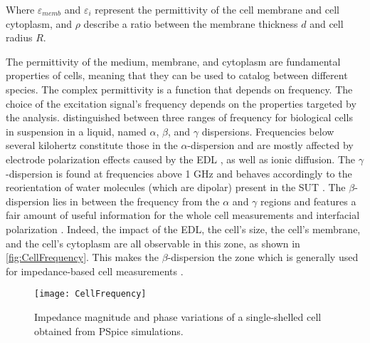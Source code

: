 Where $\varepsilon_{memb}$ and $\varepsilon_{i}$ represent the permittivity of the cell membrane and cell cytoplasm, and $\rho$ describe a ratio between the membrane thickness $d$ and cell radius $R$. \par

The permittivity of the medium, membrane, and cytoplasm are fundamental properties of cells, meaning that they can be used to catalog between different species. The complex permittivity is a function that depends on frequency. The choice of the excitation signal’s frequency depends on the properties targeted by the analysis. \citep{Schwan1963} distinguished between three ranges of frequency for biological cells in suspension in a liquid, named $\alpha$, $\beta$, and $\gamma$ dispersions. Frequencies below several kilohertz constitute those in the $\alpha$-dispersion and are mostly affected by electrode polarization effects caused by the EDL \cite{grahame1947electrical}, as well as ionic diffusion. The $\gamma$-dispersion is found at frequencies above 1 GHz and behaves accordingly to the reorientation of water molecules (which are dipolar) present in the SUT \cite{Hasted1973}. The $\beta$-dispersion lies in between the frequency from the $\alpha$ and $\gamma$ regions and features a fair amount of useful information for the whole cell measurements and interfacial polarization \cite{Caselli2010}. Indeed, the impact of the EDL, the cell’s size, the cell’s membrane, and the cell’s cytoplasm are all observable in this zone, as shown in \autoref{fig:CellFrequency}. This makes the $\beta$-dispersion the zone which is generally used for impedance-based cell measurements \cite{Xu2016,Opitz2019}.
\begin{figure}[h]
    \centering
    \texttt{[image: CellFrequency]}
    \caption{Impedance magnitude and phase variations of a single-shelled cell obtained from PSpice simulations. \citep{sun2008analytical}}
    \label{fig:CellFrequency}
\end{figure}